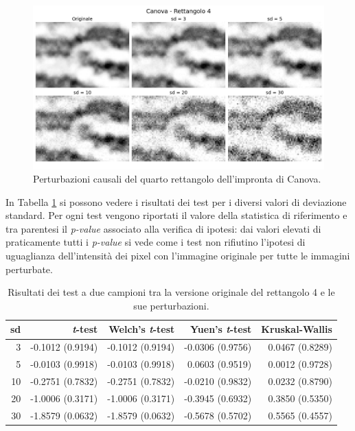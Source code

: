 \documentclass[12pt]{article}
\begin{document}
\begin{figure}[!htb]
    \centering
    \includegraphics[width=1.0\textwidth]{figures/proof1.jpg}
    \caption{Perturbazioni causali del quarto rettangolo dell'impronta di Canova.}
    \label{fig:proof1}
\end{figure}

In Tabella \ref{tab:proof_of_work} si possono vedere i risultati dei test per i diversi valori di deviazione standard. Per ogni test vengono riportati il valore della statistica di riferimento e tra parentesi il \emph{p-value} associato alla verifica di ipotesi: dai valori elevati di praticamente tutti i \emph{p-value} si vede come i test non rifiutino l'ipotesi di uguaglianza dell'intensità dei pixel con l'immagine originale per tutte le immagini perturbate.

\setlength{\tabcolsep}{8pt}
\begin{table}[!htb]
    \centering
    \begin{tabular}{rrrrr}
        \toprule
        sd & \emph{t}-test & Welch's \emph{t}-test & Yuen's \emph{t}-test &  Kruskal-Wallis \\
        \midrule 
        3 & -0.1012 (0.9194) & -0.1012 (0.9194) & -0.0306 (0.9756) & 0.0467 (0.8289)\\
        5 & -0.0103 (0.9918) & -0.0103 (0.9918) & 0.0603 (0.9519) & 0.0012 (0.9728)\\
        10 & -0.2751 (0.7832) &-0.2751 (0.7832) & -0.0210 (0.9832) & 0.0232 (0.8790)\\
        20 & -1.0006 (0.3171) & -1.0006 (0.3171) & -0.3945 (0.6932) & 0.3850 (0.5350)\\
        30 & -1.8579 (0.0632) & -1.8579 (0.0632) & -0.5678 (0.5702) & 0.5565 (0.4557)\\
        \bottomrule
        \end{tabular}
    \caption{Risultati dei test a due campioni tra la versione originale del rettangolo 4 e le sue perturbazioni.}
    \label{tab:proof_of_work}
\end{table}
\end{document}
